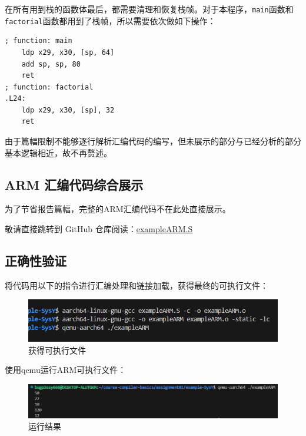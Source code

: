 \documentclass[UTF8,a4paper,10pt]{ctexart}
\begin{document}
在所有用到栈的函数体最后，都需要清理和恢复栈帧。对于本程序，\texttt{main}函数和\texttt{factorial}函数都用到了栈帧，所以需要依次做如下操作：

\begin{lstlisting}[frame=trbl,language={[x86masm]Assembler}]
; function: main
	ldp	x29, x30, [sp, 64]
	add	sp, sp, 80
	ret
; function: factorial
.L24:
	ldp	x29, x30, [sp], 32
	ret
\end{lstlisting}

由于篇幅限制不能够逐行解析汇编代码的编写，但未展示的部分与已经分析的部分基本逻辑相近，故不再赘述。

\vspace{1em}

\subsection{ARM 汇编代码综合展示}
为了节省报告篇幅，完整的ARM汇编代码不在此处直接展示。

敬请直接跳转到 GitHub 仓库阅读：\href{https://github.com/bugp3ssy666/NKU-compiler-basics/blob/main/Lab0/example-SysY/exampleARM.S}{exampleARM.S}

\vspace{1em}

\subsection{正确性验证}

将代码用以下的指令进行汇编处理和链接加载，获得最终的可执行文件：
\begin{figure} [H]
    \centering
    \includegraphics[width=0.75\linewidth]{load_process.png}
    \caption{获得可执行文件}
    \label{fig:placeholder}
\end{figure}

使用qemu运行ARM可执行文件：

\begin{figure} [H]
    \centering
    \includegraphics[width=0.85\linewidth]{runtime_result.jpg}
    \caption{运行结果}
    \label{fig:placeholder}
\end{figure}
\end{document}
